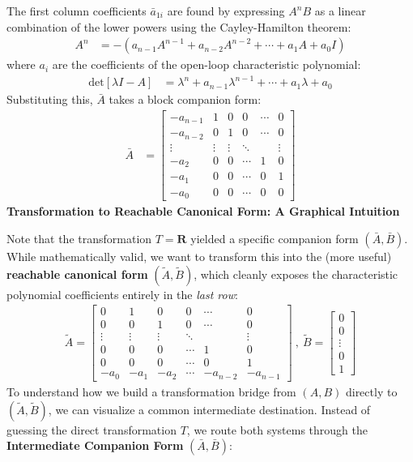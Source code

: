\documentclass[twoside, 11pt, a4paper]{article}
\begin{document}
%
The first column coefficients $\bar{a}_{1i}$ are found by expressing $A^n B$ as a linear combination of the lower powers using the Cayley-Hamilton theorem:
%
\begin{align*}
A^{n} &= - \left( a_{n-1} A^{n-1} + a_{n-2} A^{n-2} + \cdots + a_1 A + a_0 I \right) 
\end{align*}
where $a_i$ are the coefficients of the open-loop characteristic polynomial:
\begin{align*}
\mathrm{det}[\lambda I - A] &= \lambda^n + a_{n-1}  \lambda^{n-1} + \cdots + a_{1} \lambda + a_0
\end{align*}
Substituting this, $\bar{A}$ takes a block companion form:
\begin{align*}
\bar{A} &= \left[ \begin{array}{c|c|c|c|c|c} 
-a_{n-1} & 1 & 0 & 0 & \cdots & 0 \\
-a_{n-2} & 0 & 1 &  0 & \cdots & 0 \\
\vdots & \vdots & \vdots & \ddots &  & \vdots \\
-a_{2} & 0 & 0 & \cdots  & 1 & 0 \\
-a_{1} & 0 & 0 & \cdots  & 0 & 1 \\
-a_{0} & 0 & 0 & \cdots  & 0 & 0 
\end{array} 
\right] 
\end{align*}
%
\textbf{Transformation to Reachable Canonical Form: A Graphical Intuition}

Note that the transformation $T = \mathbf{R}$ yielded a specific companion form $(\bar{A}, \bar{B})$. While mathematically valid, we want to transform this into the (more useful) \textbf{reachable canonical form} $(\tilde{A}, \tilde{B})$, which cleanly exposes the characteristic polynomial coefficients entirely in the \textit{last row}:
%
\begin{align*}
\tilde{A} = \left[ \begin{array}{c|c|c|c|c|c} 
0 & 1 & 0 & 0 & \cdots & 0 \\
0 & 0 & 1 &  0 & \cdots & 0 \\
\vdots & \vdots & \vdots & \ddots &  & \vdots \\
0 & 0 & 0 & \cdots  & 1 & 0 \\
0 & 0 & 0 & \cdots  & 0 & 1 \\
-a_{0} & -a_{1} & -a_{2} & \cdots  & -a_{n-2} & -a_{n-1} 
\end{array} 
\right] 
\ , \ \tilde{B} = \begin{bmatrix} 0 \\ 0 \\ \vdots \\ 0 \\ 1 \end{bmatrix}
\end{align*}
%
To understand how we build a transformation bridge from $(A,B)$ directly to $(\tilde{A}, \tilde{B})$, we can visualize a common intermediate destination. Instead of guessing the direct transformation $T$, we route both systems through the \textbf{Intermediate Companion Form} $(\bar{A}, \bar{B})$:
\end{document}
